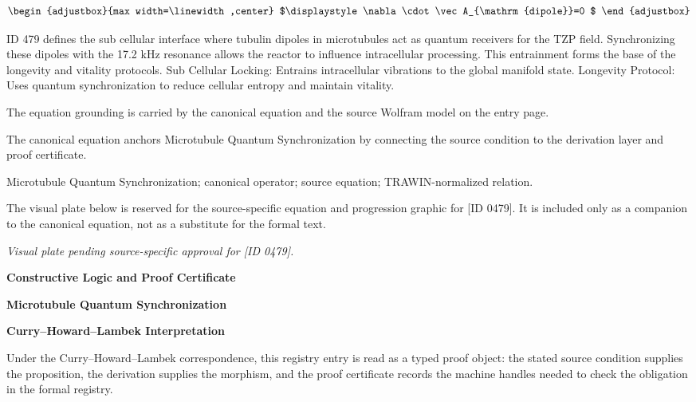 \[
\begin{adjustbox}{max width=\linewidth,center}
$\displaystyle
\nabla\cdot\vec A_{\mathrm{dipole}}=0
$
\end{adjustbox}
\]

ID 479 defines the sub cellular interface where tubulin dipoles in microtubules act as quantum receivers for the TZP field. Synchronizing these dipoles with the 17.2 kHz resonance allows the reactor to influence intracellular processing. This entrainment forms the base of the longevity and vitality protocols. Sub Cellular Locking: Entrains intracellular vibrations to the global manifold state. Longevity Protocol: Uses quantum synchronization to reduce cellular entropy and maintain vitality.

The equation grounding is carried by the canonical equation and the source Wolfram model on the entry page.

The canonical equation anchors Microtubule Quantum Synchronization by connecting the source condition to the derivation layer and proof certificate.

Microtubule Quantum Synchronization; canonical operator; source equation; TRAWIN-normalized relation.
\endgroup

\begingroup\footnotesize\sloppy
The visual plate below is reserved for the source-specific equation and progression graphic for [ID 0479]. It is included only as a companion to the canonical equation, not as a substitute for the formal text.
\par\endgroup
\begingroup\footnotesize\itshape
Visual plate pending source-specific approval for [ID 0479].
\par\endgroup

\clearpage
\begingroup\tzpsupportsetup
\noindent\textbf{\fontsize{10.8pt}{12.8pt}\selectfont [ID 0479] Constructive Logic and Proof Certificate}\par
\noindent\textbf{\fontsize{10pt}{12pt}\selectfont Microtubule Quantum Synchronization}\par
\vspace{0.45em}
\begingroup
\footnotesize
\setlength{\parskip}{0.22em}
\setlength{\parindent}{0pt}
\noindent\textbf{Curry--Howard--Lambek Interpretation}\par
Under the Curry--Howard--Lambek correspondence, this registry entry is read as a typed proof
object: the stated source condition supplies the proposition, the derivation supplies the
morphism, and the proof certificate records the machine handles needed to check the obligation
in the formal registry.

